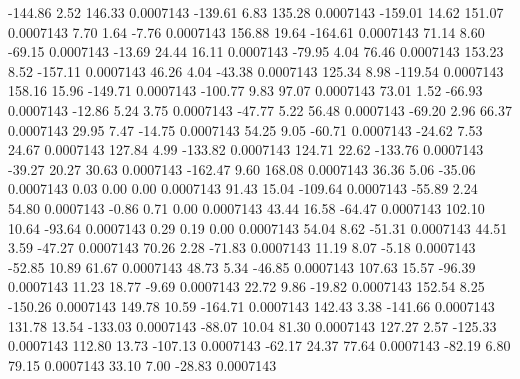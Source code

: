      -144.86        2.52      146.33     0.0007143
     -139.61        6.83      135.28     0.0007143
     -159.01       14.62      151.07     0.0007143
        7.70        1.64       -7.76     0.0007143
      156.88       19.64     -164.61     0.0007143
       71.14        8.60      -69.15     0.0007143
      -13.69       24.44       16.11     0.0007143
      -79.95        4.04       76.46     0.0007143
      153.23        8.52     -157.11     0.0007143
       46.26        4.04      -43.38     0.0007143
      125.34        8.98     -119.54     0.0007143
      158.16       15.96     -149.71     0.0007143
     -100.77        9.83       97.07     0.0007143
       73.01        1.52      -66.93     0.0007143
      -12.86        5.24        3.75     0.0007143
      -47.77        5.22       56.48     0.0007143
      -69.20        2.96       66.37     0.0007143
       29.95        7.47      -14.75     0.0007143
       54.25        9.05      -60.71     0.0007143
      -24.62        7.53       24.67     0.0007143
      127.84        4.99     -133.82     0.0007143
      124.71       22.62     -133.76     0.0007143
      -39.27       20.27       30.63     0.0007143
     -162.47        9.60      168.08     0.0007143
       36.36        5.06      -35.06     0.0007143
        0.03        0.00        0.00     0.0007143
       91.43       15.04     -109.64     0.0007143
      -55.89        2.24       54.80     0.0007143
       -0.86        0.71        0.00     0.0007143
       43.44       16.58      -64.47     0.0007143
      102.10       10.64      -93.64     0.0007143
        0.29        0.19        0.00     0.0007143
       54.04        8.62      -51.31     0.0007143
       44.51        3.59      -47.27     0.0007143
       70.26        2.28      -71.83     0.0007143
       11.19        8.07       -5.18     0.0007143
      -52.85       10.89       61.67     0.0007143
       48.73        5.34      -46.85     0.0007143
      107.63       15.57      -96.39     0.0007143
       11.23       18.77       -9.69     0.0007143
       22.72        9.86      -19.82     0.0007143
      152.54        8.25     -150.26     0.0007143
      149.78       10.59     -164.71     0.0007143
      142.43        3.38     -141.66     0.0007143
      131.78       13.54     -133.03     0.0007143
      -88.07       10.04       81.30     0.0007143
      127.27        2.57     -125.33     0.0007143
      112.80       13.73     -107.13     0.0007143
      -62.17       24.37       77.64     0.0007143
      -82.19        6.80       79.15     0.0007143
       33.10        7.00      -28.83     0.0007143
